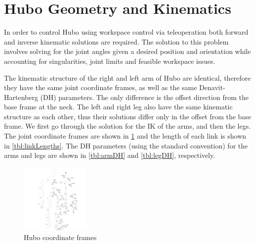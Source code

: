 \documentclass[letterpaper, 10 pt, conference]{IEEEtran}
\begin{document}
\section{Hubo Geometry and Kinematics} \label{sec:huboGeoKinematics}
In order to control Hubo using workspace control via teleoperation both forward and inverse kinematic solutions are required. The solution to this problem involves solving for the joint angles given a desired position and orientation while accounting for singularities, joint limits and feasible workspace issues.

The kinematic structure of the right and left arm of Hubo are identical, therefore they have the same joint coordinate frames, as well as the same Denavit-Hartenberg (DH) parameters. The only difference is the offset direction from the base frame at the neck. The left and right leg also have the same kinematic structure as each other, thus their solutions differ only in the offset from the base frame. We first go through the solution for the IK of the arms, and then the legs. The joint coordinate frames are shown in \cref{fig:huboCoordinates} and the length of each link is shown in \cref{tbl:linkLengths}. The DH parameters (using the standard convention) for the arms and legs are shown in \cref{tbl:armDH} and \cref{tbl:legDH}, respectively. 

\begin{figure}[h]
  \centering
  \includegraphics[width=0.3\textwidth]{figures/Hubo-Coordinates.pdf}
  \caption{Hubo coordinate frames}
  \label{fig:huboCoordinates}
\end{figure}
\end{document}

